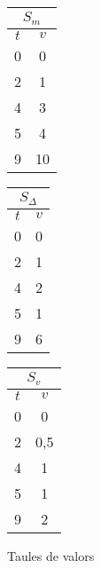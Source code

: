   \begin{subfigure}{\textwidth}
    \centering
  \begin{tabular}[c]{|c|c|}
    \multicolumn{2}{c}{$S_m$} \\ \hline
    $t$  & $v$ \\ \hline
    0   & 0 \\
    2   & 1 \\
    4   & 3 \\
    5   & 4 \\
    9   & 10 \\ \hline
  \end{tabular} \qquad
  \begin{tabular}[c]{|c|c|}
    \multicolumn{2}{c}{$S_\Delta$} \\ \hline
    $t$  & $v$ \\ \hline
    0   & 0 \\
    2 & 1 \\
    4 & 2 \\
    5 & 1 \\
    9 & 6 \\ \hline
  \end{tabular} \qquad
  \begin{tabular}[c]{|c|c|}
    \multicolumn{2}{c}{$S_v$} \\ \hline
    $t$  & $v$ \\ \hline
    0   & 0 \\
    2 & 0{,}5 \\
    4 & 1 \\
    5 & 1 \\
    9 & 2 \\ \hline
  \end{tabular}
  \caption{Taules de valors}
  \end{subfigure}

